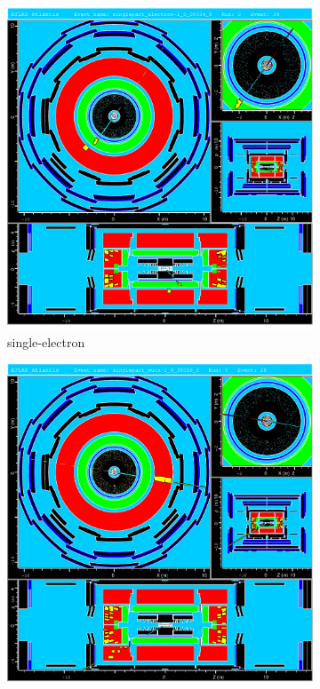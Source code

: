 \begin{figure}[h]
	\begin{subfigure}{0.45\textwidth}
		\includegraphics[width=\textwidth]{../figures/LearningData_electron.pdf}
		\caption{single-electron}
    		\label{fig:LearningData_electron}
	\end{subfigure}
	\hfill
	\begin{subfigure}{0.45\textwidth}
	 	\includegraphics[width=\textwidth]{../figures/LearningData_muon.pdf}

\end{subfigure}
\end{figure}
